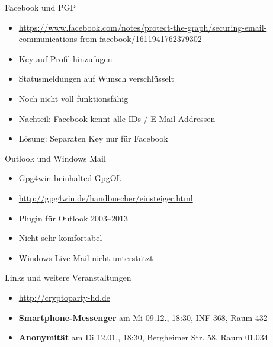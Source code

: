 \begin{frame}{Facebook und PGP}
	\begin{itemize}
		\item \url{https://www.facebook.com/notes/protect-the-graph/securing-email-communications-from-facebook/1611941762379302}
		\item Key auf Profil hinzufügen
		\item Statusmeldungen auf Wunsch verschlüsselt
		\item Noch nicht voll funktionsfähig
		\item Nachteil: Facebook kennt alle IDs / E-Mail Addressen
		\item Lösung: Separaten Key nur für Facebook
	\end{itemize}
\end{frame}

\begin{frame}{Outlook und Windows Mail}
	\begin{itemize}
		\item Gpg4win beinhalted GpgOL
		\item \url{http://gpg4win.de/handbuecher/einsteiger.html}
		\item Plugin für Outlook 2003--2013
		\item Nicht sehr komfortabel
		\item Windows Live Mail nicht unterstützt
	\end{itemize}
\end{frame}

\begin{frame}{Links und weitere Veranstaltungen}
	\begin{itemize}
		\item \url{http://cryptoparty-hd.de} \\[10pt]
		\item \textbf{Smartphone-Messenger} am Mi 09.12., 18:30, INF 368, Raum 432
		\item \textbf{Anonymität} am Di 12.01., 18:30, Bergheimer Str. 58, Raum 01.034
	\end{itemize}
\end{frame}

